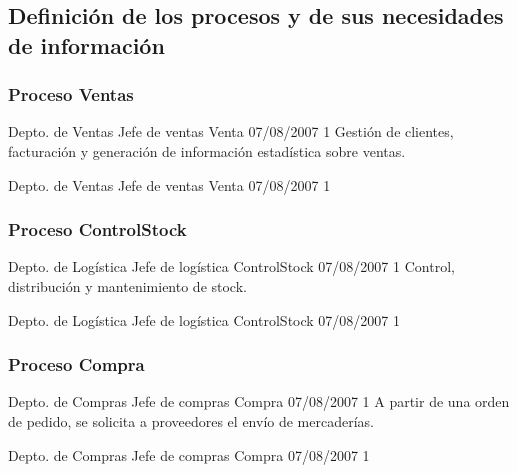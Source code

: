 \subsection{Definición de los procesos y de sus necesidades de información}

\subsubsection{Proceso \textsf{Ventas}}

\begin{apx1}
{Depto. de Ventas}
{Jefe de ventas}
{Venta}
{07/08/2007}
{1}
{Gestión de clientes, facturación y generación de información estadística sobre ventas.}
\end{apx1}

\begin{apx2}
{Depto. de Ventas}
{Jefe de ventas}
{Venta}
{07/08/2007}
{1}
  \apxDosItem{}{}{}{}
\end{apx2}


\subsubsection{Proceso \textsf{ControlStock}}

\begin{apx1}
{Depto. de Logística}
{Jefe de logística}
{ControlStock}
{07/08/2007}
{1}
{Control, distribución y mantenimiento de stock.}
\end{apx1}

\begin{apx2}
{Depto. de Logística}
{Jefe de logística}
{ControlStock}
{07/08/2007}
{1}
  \apxDosItem{}{}{}{}
\end{apx2}


\subsubsection{Proceso \textsf{Compra}}
\begin{apx1}
{Depto. de Compras}
{Jefe de compras}
{Compra}
{07/08/2007}
{1}
{A partir de una orden de pedido, se solicita a proveedores el envío de mercaderías.}
\end{apx1}

\begin{apx2}
{Depto. de Compras}
{Jefe de compras}
{Compra}
{07/08/2007}
{1}
  \apxDosItem{}{}{}{}
\end{apx2}

